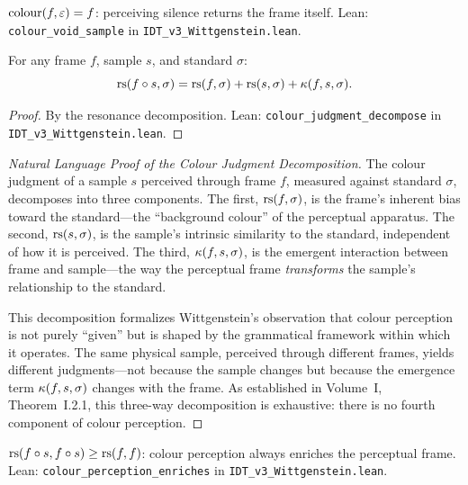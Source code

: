 \begin{theorem}
\label{thm:colour-void-sample}
$\mathrm{colour}(f, \varepsilon) = f$: perceiving silence returns the frame itself.
Lean: \texttt{colour\_void\_sample} in \texttt{IDT\_v3\_Wittgenstein.lean}.
\end{theorem}

\begin{theorem}
\label{thm:colour-judgment}
For any frame $f$, sample $s$, and standard $\sigma$:
\[
\mathrm{rs}(f \circ s, \sigma) = \mathrm{rs}(f, \sigma) + \mathrm{rs}(s, \sigma)
+ \kappa(f, s, \sigma).
\]
\end{theorem}

\begin{proof}
By the resonance decomposition.
Lean: \texttt{colour\_judgment\_decompose} in
\texttt{IDT\_v3\_Wittgenstein.lean}.
\end{proof}

\begin{proof}[Natural Language Proof of the Colour Judgment Decomposition]
The colour judgment of a sample $s$ perceived through frame $f$, measured
against standard $\sigma$, decomposes into three components. The first,
$\mathrm{rs}(f, \sigma)$, is the frame's inherent bias toward the standard---the
``background colour'' of the perceptual apparatus. The second, $\mathrm{rs}(s, \sigma)$,
is the sample's intrinsic similarity to the standard, independent of how
it is perceived. The third, $\kappa(f, s, \sigma)$, is the emergent
interaction between frame and sample---the way the perceptual frame
\emph{transforms} the sample's relationship to the standard.

This decomposition formalizes Wittgenstein's observation that colour perception
is not purely ``given'' but is shaped by the grammatical framework within which
it operates. The same physical sample, perceived through different frames, yields
different judgments---not because the sample changes but because the emergence
term $\kappa(f, s, \sigma)$ changes with the frame. As established in Volume~I,
Theorem~I.2.1, this three-way decomposition is exhaustive: there is no fourth
component of colour perception.
\end{proof}

\begin{theorem}
\label{thm:colour-enriches}
$\mathrm{rs}(f \circ s, f \circ s) \geq \mathrm{rs}(f, f)$: colour perception
always enriches the perceptual frame.
Lean: \texttt{colour\_perception\_enriches} in
\texttt{IDT\_v3\_Wittgenstein.lean}.
\end{theorem}

